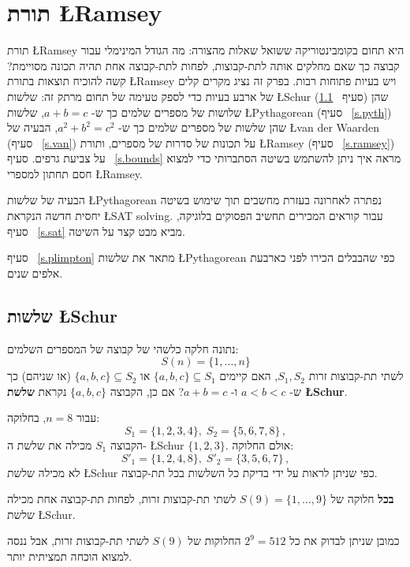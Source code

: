 

\chapter{תורת \L{Ramsey}}\label{c.ramsey}

תורת 
\L{Ramsey}
היא תחום בקומבינטוריקה ששואל שאלות מהצורה: מה הגודל המינימלי עבור קבוצה כך שאם מחלקים אותה לתת-קבוצות, לפחות לתת-קבוצה אחת תהיה תכונה מסויימת? קשה להוכיח תוצאות בתורת 
\L{Ramsey}
ויש בעיות פתוחות רבות. בפרק זה נציג מקרים קלים של ארבע בעיות כדי לספק טעימה של תחום מרתק זה: שלשות
\L{Schur}
(סעיף%
~\ref{s.schur})
שהן שלושות של מספרים שלמים כך ש-%
$a+b=c$,
שלשות
\L{Pythagorean}
(סעיף%
~\ref{s.pyth})
שהן שלשות של מספרים שלמים כך ש-%
$a^2+b^2=c^2$,
הבעיה של
\L{van der Waarden}
(סעיף%
~\ref{s.van})
על תכונות של סדרות של מספרים, ותורת
\L{Ramsey}
(סעיף%
~\ref{s.ramsey})
על צביעת גרפים. סעיף%
~\ref{s.bounds}
מראה איך ניתן להשתמש בשיטה הסתברותי כדי למצוא חסם תחתון למספרי
\L{Ramsey}.

הבעיה של שלשות
\L{Pythagorean}
נפתרה לאחרונה בעזרת מחשבים תוך שימוש בשיטה יחסית חדשה הנקראת 
\L{SAT solving}.
עבור קוראים המכירים תחשיב הפסוקים בלוגיקה, סעיף%
~\ref{s.sat}
מביא מבט קצר על השיטה.

סעיף%
~\ref{s.plimpton}
מתאר את שלשות 
\L{Pythagorean}
כפי שהבבלים הכירו לפני כארבעת אלפים שנים.


\section{שלשות \L{Schur}}\label{s.schur}

\begin{definition}
נתונה חלקה כלשהי של קבוצה של המספרים השלמים:
\[
S(n)=\{1,\ldots,n\}
\]
לשתי תת-קבוצות זרות
$S_1,S_2$,
האם קיימים
$\{a,b,c\}\subseteq S_1$
או
$\{a,b,c\}\subseteq S_2$
(או שניהם) כך ש-%
$a\!<\!b\!<\!c$
ו-%
$a+b=c$?
אם כן, הקבוצה 
$\{a,b,c\}$
נקראת 
\textbf{שלשת \L{Schur}}.
\end{definition}

\begin{example}
עבור
$n=8$,
בחלוקה:
\begin{equation}
S_1 = \{1,2,3,4\},\; S_2 = \{5,6,7,8\}\,,
\label{eq.schur0}
\end{equation}
הקבוצה
$S_1$
מכילה את שלשת ה-%
\L{Schur}
$\{1,2,3\}$.
אולם החלוקה:
\begin{equation}
S'_1 = \{1,2,4,8\},\; S'_2 = \{3,5,6,7\}\,,
\label{eq:schur1}
\end{equation}
לא מכילה שלשת
\L{Schur}
כפי שניתן לראות על ידי בדיקת כל השלשות בכל תת-קבוצה.
\end{example}
\begin{theorem}
\textbf{בכל}
חלוקה של
$S(9)=\{1,\ldots,9\}$
לשתי תת-קבוצות זרות, לפחות תת-קבוצה אחת מכילה שלשת
\L{Schur}.
\end{theorem}
כמובן שניתן לבדוק את כל
$2^9=512$
החלוקות של 
$S(9)$
לשתי תת-קבוצות זרות, אבל ננסה למצוא הוכחה תמציתית יותר.

